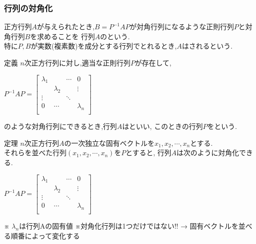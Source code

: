 \documentclass[a4paper]{jsarticle}
\begin{document}
\subsubsection{行列の対角化}
正方行列$A$が与えられたとき,$B=P^{-1}AP$が対角行列になるような正則行列$P$と対角行列$B$を求めることを
行列$A$のという.\\
特に$P,B$が実数(複素数)を成分とする行列でとれるとき,$A$はされるという.
\begin{itembox}[l]{定義}
    $n$次正方行列に対し,適当な正則行列$P$が存在して,\\
    \begin{center}
        $P^{-1}AP=
            \begin{bmatrix}
                \lambda_1 &           & \cdots & 0         \\
                          & \lambda_2 &        & \vdots    \\
                \vdots    &           & \ddots &           \\
                0         & \cdots    &        & \lambda_n \\
            \end{bmatrix}
        $
    \end{center}
    のような対角行列にできるとき,行列$A$はといい,
    このときの行列$P$をという.\\
\end{itembox}
\begin{itembox}[l]{定理}
    $n$次正方行列$A$の一次独立な固有ベクトルを$x_1,x_2,\cdots,x_n$とする.\\
    それらを並べた行列$\left(x_1,x_2,\cdots,x_n\right)$を$P$とすると,
    行列$A$は次のように対角化できる.
    \begin{center}
        $P^{-1}AP=
            \begin{bmatrix}
                \lambda_1 &           & \cdots & 0         \\
                          & \lambda_2 &        & \vdots    \\
                \vdots    &           & \ddots &           \\
                0         & \cdots    &        & \lambda_n \\
            \end{bmatrix}
        $
    \end{center}
    ※ $\lambda_n$は行列Aの固有値
    ※対角化行列は1つだけではない!! → 固有ベクトルを並べる順番によって変化する
\end{itembox}
\end{document}

